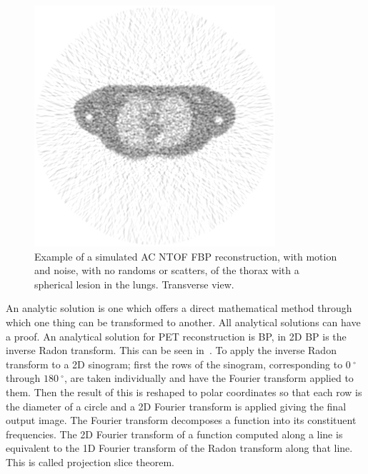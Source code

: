            \begin{figure}
                \centering
                
                \includegraphics[width=1.0\linewidth]{figures/background_fbp_example.png}
                
                \captionsetup{singlelinecheck=false, justification=raggedright}
                \caption{Example of a simulated \gls{AC} \gls{NTOF} \gls{FBP} reconstruction, with motion and noise, with no randoms or scatters, of the thorax with a spherical lesion in the lungs. Transverse view.}
                \label{fig:analytic_image_reconstruction_fbp_example}
            \end{figure}
            
            An analytic solution is one which offers a direct mathematical method through which one thing can be transformed to another. All analytical solutions can have a proof. An analytical solution for \gls{PET} reconstruction is \gls{BP}, in \gls{2D} \gls{BP} is the inverse Radon transform. This can be seen in~. To apply the inverse Radon transform to a \gls{2D} sinogram; first the rows of the sinogram, corresponding to $\SI{0}{^{\circ}}$ through $\SI{180}{^{\circ}}$, are taken individually and have the Fourier transform applied to them. Then the result of this is reshaped to polar coordinates so that each row is the diameter of a circle and a \gls{2D} Fourier transform is applied giving the final output image. The Fourier transform decomposes a function into its constituent frequencies. The \gls{2D} Fourier transform of a function computed along a line is equivalent to the 1D Fourier transform of the Radon transform along that line. This is called projection slice theorem. 
            
